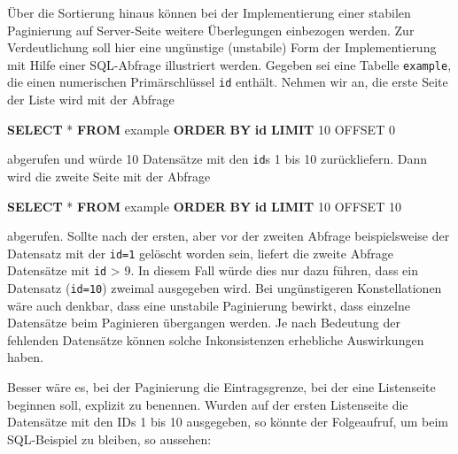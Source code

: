 \documentclass[,a4paper]{article}
\newenvironment{Shaded}{}{}
\newcommand{\KeywordTok}[1]{\textcolor[rgb]{0.00,0.44,0.13}{\textbf{{#1}}}}
\newcommand{\DecValTok}[1]{\textcolor[rgb]{0.25,0.63,0.44}{{#1}}}
\newcommand{\NormalTok}[1]{{#1}}
\begin{document}
Über die Sortierung hinaus können bei der Implementierung einer stabilen
Paginierung auf Server-Seite weitere Überlegungen einbezogen werden. Zur
Verdeutlichung soll hier eine ungünstige (unstabile) Form der
Implementierung mit Hilfe einer SQL-Abfrage illustriert werden. Gegeben
sei eine Tabelle \texttt{example}, die einen numerischen Primärschlüssel
\texttt{id} enthält. Nehmen wir an, die erste Seite der Liste wird mit
der Abfrage

\begin{Shaded}
\begin{Highlighting}[]
\KeywordTok{SELECT} \NormalTok{* }\KeywordTok{FROM} \NormalTok{example }\KeywordTok{ORDER} \KeywordTok{BY} \KeywordTok{id} \KeywordTok{LIMIT} \DecValTok{10} \NormalTok{OFFSET }\DecValTok{0}
\end{Highlighting}
\end{Shaded}

abgerufen und würde 10 Datensätze mit den \texttt{id}s 1 bis 10
zurückliefern. Dann wird die zweite Seite mit der Abfrage

\begin{Shaded}
\begin{Highlighting}[]
\KeywordTok{SELECT} \NormalTok{* }\KeywordTok{FROM} \NormalTok{example }\KeywordTok{ORDER} \KeywordTok{BY} \KeywordTok{id} \KeywordTok{LIMIT} \DecValTok{10} \NormalTok{OFFSET }\DecValTok{10}
\end{Highlighting}
\end{Shaded}

abgerufen. Sollte nach der ersten, aber vor der zweiten Abfrage
beispielsweise der Datensatz mit der \texttt{id=1} gelöscht worden sein,
liefert die zweite Abfrage Datensätze mit \texttt{id} \textgreater{} 9.
In diesem Fall würde dies nur dazu führen, dass ein Datensatz
(\texttt{id=10}) zweimal ausgegeben wird. Bei ungünstigeren
Konstellationen wäre auch denkbar, dass eine unstabile Paginierung
bewirkt, dass einzelne Datensätze beim Paginieren übergangen werden. Je
nach Bedeutung der fehlenden Datensätze können solche Inkonsistenzen
erhebliche Auswirkungen haben.

Besser wäre es, bei der Paginierung die Eintragsgrenze, bei der eine
Listenseite beginnen soll, explizit zu benennen. Wurden auf der ersten
Listenseite die Datensätze mit den IDs 1 bis 10 ausgegeben, so könnte
der Folgeaufruf, um beim SQL-Beispiel zu bleiben, so aussehen:
\end{document}
